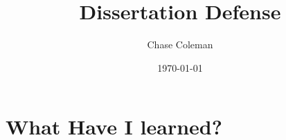 \documentclass[10pt]{beamer}
\title{Dissertation Defense}
\author{Chase Coleman}
\institute{NYU Stern}
\date[]{\today}
\begin{document}
\begin{frame}
  \thispagestyle{empty}
  \titlepage
\end{frame}

\section{What Have I learned?}
\begin{frame}

\end{frame}
\end{document}
